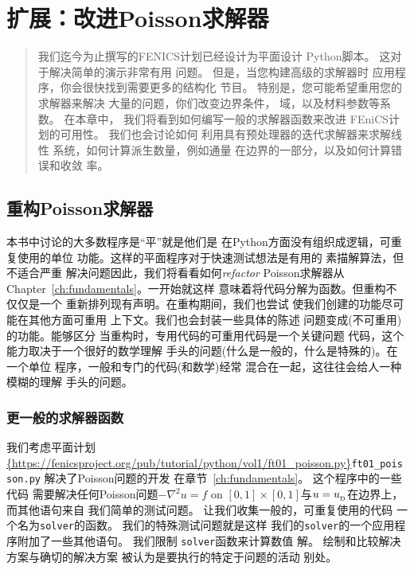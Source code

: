 \chapter{扩展：改进Poisson求解器}
\label{ch:poisson}


\begin{quote}
我们迄今为止撰写的FENICS计划已经设计为平面设计
Python脚本。 这对于解决简单的演示非常有用
问题。 但是，当您构建高级的求解器时
应用程序，你会很快找到需要更多的结构化
节目。 特别是，您可能希望重用您的求解器来解决
大量的问题，你们改变边界条件，
域，以及材料参数等系数。 在本章中，
我们将看到如何编写一般的求解器函数来改进
FEniCS计划的可用性。 我们也会讨论如何
利用具有预处理器的迭代求解器来求解线性
系统，如何计算派生数量，例如通量
在边界的一部分，以及如何计算错误和收敛
率。
\end{quote}

\section{重构Poisson求解器}
\label{ch:poisson0:impl2}


本书中讨论的大多数程序是“平”就是他们是
在Python方面没有组织成逻辑，可重复使用的单位
功能。这样的平面程序对于快速测试想法是有用的
素描解算法，但不适合严重
解决问题因此，我们将看看如何\emph{refactor}
Poisson求解器从Chapter~\ref{ch:fundamentals}。一开始就这样
意味着将代码分解为函数。但重构不仅仅是一个
重新排列现有声明。在重构期间，我们也尝试
使我们创建的功能尽可能在其他方面可重用
上下文。我们也会封装一些具体的陈述
问题变成(不可重用)的功能。能够区分
当重构时，专用代码的可重用代码是一个关键问题
代码，这个能力取决于一个很好的数学理解
手头的问题(什么是一般的，什么是特殊的)。在一个单位
程序，一般和专门的代码(和数学)经常
混合在一起，这往往会给人一种模糊的理解
手头的问题。

\subsection{更一般的求解器函数}
\label{ch:poisson0:impl2:func}

我们考虑平面计划
\url{{https://fenicsproject.org/pub/tutorial/python/vol1/ft01_poisson.py}}{\nolinkurl{ft01_poisson.py}}
解决了Poisson问题的开发
在章节~\ref{ch:fundamentals}。
这个程序中的一些代码
需要解决任何Poisson问题$-\nabla^2 u=f$ on $[0,1]\times
[0,1]$与$u=\ub$在边界上，而其他语句来自
我们简单的测试问题。 让我们收集一般的，可重复使用的代码
一个名为\texttt{solver}的函数。 我们的特殊测试问题就是这样
我们的\texttt{solver}的一个应用程序附加了一些其他语句。 我们限制
\texttt{solver}函数来计算数值
解。 绘制和比较解决方案与确切的解决方案
被认为是要执行的特定于问题的活动
别处。

